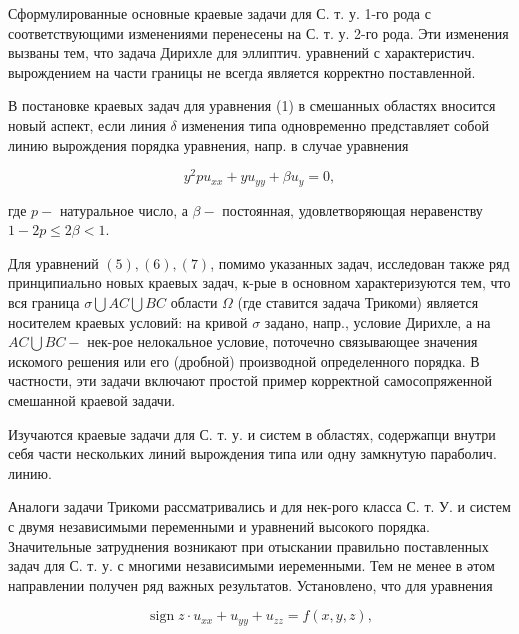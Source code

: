 \documentclass[10pt]{article}
\begin{document}
Сформулированные основные краевые задачи для С. т. у. 1-го рода с соответствующими изменениями перенесены на С. т. у. 2-го рода. Эти изменения вызваны тем, что задача Дирихле для эллиптич. уравнений с характеристич. вырождением на части границы не всегда является корректно поставленной.



В постановке краевых задач для уравнения (1) в смешанных областях вносится новый аспект, если линия $\delta$ изменения типа одновременно представляет собой линию вырождения порядка уравнения, напр. в случае уравнения



\[

y^{2} p u_{x x}+y u_{y y}+\beta u_{y}=0,

\]



где $p-$ натуральное число, а $\beta-$ постоянная, удовлетворяющая неравенству $1-2 p \leqslant 2 \beta<1$.



Для уравнений $(5),(6),(7)$, помимо указанных задач, исследован также ряд принципиально новых краевых задач, к-рые в основном характеризуются тем, что вся граница $\sigma \bigcup A C \bigcup B C$ области $\Omega$ (где ставится задача Трикоми) является носителем краевых условий: на кривой $\sigma$ задано, напр., условие Дирихле, а на $A C \bigcup B C-$ нек-рое нелокальное условие, поточечно связывающее значения искомого решения или его (дробной) производной определенного порядка. В частности, эти задачи включают простой пример корректной самосопряженной смешанной краевой задачи.



Изучаются краевые задачи для С. т. у. и систем в областях, содержапци внутри себя части нескольких линий вырождения типа или одну замкнутую параболич. линию.



Аналоги задачи Трикоми рассматривались и для нек-рого класса С. т. У. и систем с двумя независимыми переменными и уравнений высокого порядка. Значительные затруднения возникают при отыскании правильно поставленных задач для С. т. у. с многими независимыми иеременными. Тем не менее в әтом направлении получен ряд важных результатов. Установлено, что для уравнения



\[

\operatorname{sign} z \cdot u_{x x}+u_{y y}+u_{z z}=f(x, y, z),

\]
\end{document}
